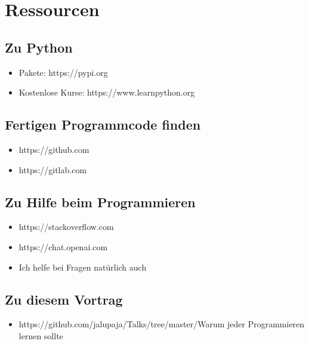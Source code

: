 \documentclass{article}
\begin{document}
\section{Ressourcen}

\subsection*{Zu Python}
\begin{itemize}
	\item Pakete: https://pypi.org
	\item Kostenlose Kurse: https://www.learnpython.org
\end{itemize}

\subsection*{Fertigen Programmcode finden}
\begin{itemize}
	\item https://github.com
	\item https://gitlab.com
\end{itemize}

\subsection*{Zu Hilfe beim Programmieren}
\begin{itemize}
	\item https://stackoverflow.com
	\item https://chat.openai.com
	\item Ich helfe bei Fragen natürlich auch
\end{itemize}

\subsection*{Zu diesem Vortrag}
\begin{itemize}
	\item https://github.com/jalupaja/Talks/tree/master/Warum jeder Programmieren lernen sollte
\end{itemize}
\end{document}

